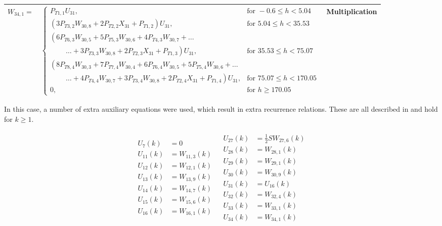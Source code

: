 \begin{longtable}{|p{1.5cm}|l|p{2cm}|}
$W_{34,1}=$ & $ 
\begin{cases}
P_{T 1,1}U_{31}, & \text{for } -0.6 \leq h < 5.04  \\
\left(3P_{T 3,2}W_{30,8}+2P_{T 2,2}X_{31}+P_{T 1,2}\right)U_{31}, &  \text{for } 5.04\leq h < 35.53   \\
\left(6 P_{T 6,3}W_{30,5}+5P_{T 5,3}W_{30,6}+4P_{T 4,3}W_{30,7}+ \dots
\right. \\
\qquad\  \left. \dotsc +3P_{T 3,3}W_{30,8}+2P_{T 2,3}X_{31}+P_{T 1,3}\right)U_{31}, &  \text{for } 35.53\leq h < 75.07   \\
\left(8 P_{T 8,4}W_{30,3}+7P_{T 7,4}W_{30,4}+6P_{T 6,4}W_{30,5}
+5P_{T 5,4}W_{30,6}+ \dots \right. \\
\qquad\  \left. \dotsc +4P_{T 4,4}W_{30,7}+3P_{T 3,4}W_{30,8}+2P_{T 2,4}X_{31}+P_{T 1,4}\right)U_{31}, &  \text{for } 75.07\leq h < 170.05   \\
0, &  \text{for }  h \geq 170.05   
\end{cases}
 $ & Multiplication \\ \hline


\end{longtable}




In this case, a number of extra auxiliary equations were used, which result in extra recurrence relations. These are all described in  and hold for $k\geq 1$.

\begin{align} \label{eq:allRecRel3}
\begin{split}
U_{7} \left(k\right)&=0 \\
U_{11}\left(k\right)&=W_{11,3}\left(k\right)\\
U_{12}\left(k\right)&=W_{12,1}\left(k\right)\\
U_{13}\left(k\right)&=W_{13,9}\left(k\right)\\
U_{14}\left(k\right)&=W_{14,7}\left(k\right)\\
U_{15}\left(k\right)&=W_{15,6}\left(k\right)\\
U_{16}\left(k\right)&=W_{16,1}\left(k\right)\\
\end{split}
&
\begin{split}
U_{27}\left(k\right)&=\frac{1}{2}SW_{27,6}\left(k\right)\\
U_{28}\left(k\right)&=W_{28,1}\left(k\right)\\
U_{29}\left(k\right)&=W_{29,1}\left(k\right)\\
U_{30}\left(k\right)&=W_{30,9}\left(k\right)\\
U_{31}\left(k\right)&=U_{16}\left(k\right)\\
U_{32}\left(k\right)&=W_{32,4}\left(k\right)\\
U_{33}\left(k\right)&=W_{33,1}\left(k\right)\\
U_{34}\left(k\right)&=W_{34,1}\left(k\right)\\
\end{split}
\end{align}




